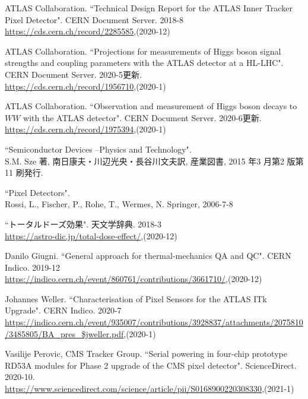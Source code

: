 \begin{thebibliography}{9}
ATLAS Collaboration. ``Technical Design Report for the ATLAS Inner Tracker Pixel Detector". CERN Document Server. 2018-8\\
\url{https://cds.cern.ch/record/2285585},(2020-12)


ATLAS Collaboration. ``Projections for measurements of Higgs boson signal strengths and coupling parameters with the ATLAS detector at a HL-LHC". CERN Document Server. 2020-5更新.\\
\url{https://cds.cern.ch/record/1956710},(2020-1)

ATLAS Collaboration. ``Observation and measurement of Higgs boson decays to $WW$ with the ATLAS detector". CERN Document Server. 2020-6更新.\\
\url{https://cds.cern.ch/record/1975394},(2020-1)

``Semiconductor Devices –Physics and Technology".\\
S.M. Sze 著, 南日康夫・川辺光央・長谷川文夫訳, 産業図書, 2015 年3 月第2 版第11 刷発行.

``Pixel Detectors". \\
Rossi, L., Fischer, P., Rohe, T., Wermes, N. Springer, 2006-7-8

``トータルドーズ効果". 天文学辞典. 2018-3\\
\url{https://astro-dic.jp/total-dose-effect/},(2020-12)

Danilo Giugni. ``General approach for thermal-mechanics QA and QC". CERN Indico. 2019-12\\
\url{https://indico.cern.ch/event/860761/contributions/3661710/},(2020-12)

Johannes Weller. ``Characterisation of Pixel Sensors for the ATLAS ITk Upgrade". CERN Indico. 2020-7\\
\url{https://indico.cern.ch/event/935007/contributions/3928837/attachments/2075810/3485805/BA_pres_$jweller.pdf},(2020-1)

Vasilije Perovic, CMS Tracker Group. ``Serial powering in four-chip prototype RD53A modules for Phase 2 upgrade of the CMS pixel detector". ScienceDirect. 2020-10.\\
\url{https://www.sciencedirect.com/science/article/pii/S0168900220308330},(2021-1)


\end{thebibliography}
